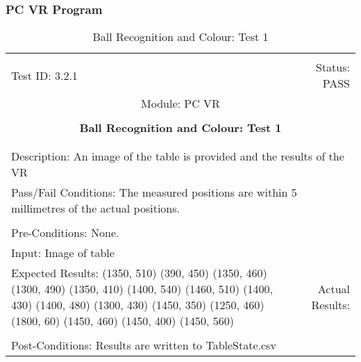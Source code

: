 \documentclass[titlepage]{article}
\begin{document}
\subsubsection{PC VR Program}
\begin{center}
\begin{table}[h!]
\begin{tabular}{|l r|}\hline&\\[-2mm]
	Test ID: 3.2.1	&Status: PASS\\[-3mm]
	\multicolumn{2}{|c|}{Module: PC VR}\\&\\
	\multicolumn{2}{|c|}{\textbf{\large{Ball Recognition and Colour: Test 1}}}\\&\\\hline&\\[-3mm]
	\multicolumn{2}{|p{\textwidth}|}{Description: An image of the table is provided and the results of the VR }\\\hline
	\multicolumn{2}{|p{\textwidth}|}{Pass/Fail Conditions: The measured positions are within 5 millimetres of the actual positions.}\\[1mm]\hline&\\[-3mm]
	\multicolumn{2}{|p{\textwidth}|}{Pre-Conditions: None.}\\[4mm]
	\multicolumn{2}{|p{\textwidth}|}{Input: Image of table}\\[2mm]\hline
	\multicolumn{1}{|p{0.49\textwidth}}{Expected Results:\newline
(1350, 510)\newline
(390, 450)\newline
(1350, 460)\newline
(1300, 490)\newline
(1350, 410)\newline
(1400, 540)\newline
(1460, 510)\newline
(1400, 430)\newline
(1400, 480)\newline
(1300, 430)\newline
(1450, 350)\newline
(1250, 460)\newline
(1800, 60)\newline
(1450, 460)\newline
(1450, 400)\newline
(1450, 560)\newline}	&\multicolumn{1}{|p{0.45\textwidth}|}{Actual Results: }\\\hline&\\[-3mm]
	\multicolumn{2}{|p{\textwidth}|}{Post-Conditions: Results are written to TableState.csv}\\\hline
\end{tabular}
\caption{Ball Recognition and Colour: Test 1}
\end{table}
\end{center}
\newpage
\end{document}
